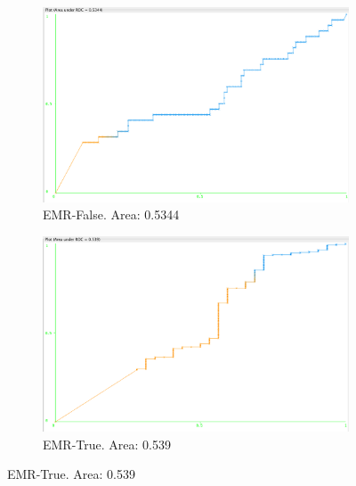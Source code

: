 \documentclass[11pt, notitlepage,abstracton,oneside]{article}   	%
\begin{document}
\begin{figure}[H]
    \begin{subfigure}[b]{0.45\textwidth}
        \centering
        \includegraphics[width=\textwidth]{figures/approach2/EMR-False(0)}
        \caption{EMR-False. Area: 0.5344}
        \label{fig:EMR-False(0)}
    \end{subfigure}
    \hfill
    \begin{subfigure}[b]{0.45\textwidth}
        \centering
        \includegraphics[width=\textwidth]{figures/approach2/EMR-True(1)}
        \caption{EMR-True. Area: 0.539}
        \label{fig:EMR-True(1)}
    \end{subfigure}
    \hfill


\end{figure}
\end{document}
